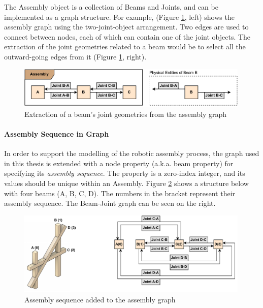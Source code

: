 The Assembly object is a collection of Beams and Joints, and can be implemented as a graph structure. For example, (Figure \ref{fig:eextraction-of-beam-geometry}, left) shows the assembly graph using the two-joint-object arrangement. Two edges are used to connect between nodes, each of which can contain one of the joint objects. The extraction of the joint geometries related to a beam would be to select all the outward-going edges from it (Figure \ref{fig:eextraction-of-beam-geometry}, right).

\begin{figure}[!h]
    \centering
    \includegraphics[width=0.99\textwidth]{images/05/image68.pdf}
    \caption{Extraction of a beam's joint geometries from the assembly graph}
    \label{fig:eextraction-of-beam-geometry}
\end{figure}

\FloatBarrier

\paragraph{Assembly Sequence in Graph}

In order to support the modelling of the robotic assembly process, the graph used in this thesis is extended with a node property (a.k.a. beam property) for specifying its \textit{assembly sequence}. The property is a zero-index integer, and its values should be unique within an Assembly. Figure \ref{fig:assemble-sequence-added-to-the-assembly-graph} shows a structure below with four beams (A, B, C, D). The numbers in the bracket represent their assembly sequence. The Beam-Joint graph can be seen on the right.

\begin{figure}[!h]
    \centering
    \includegraphics[width=0.99\textwidth]{images/05/image103.pdf}
    \caption{Assembly sequence added to the assembly graph}
    \label{fig:assemble-sequence-added-to-the-assembly-graph}
\end{figure}

